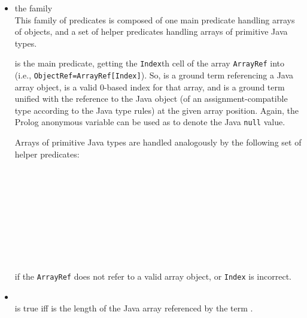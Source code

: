 \begin{itemize}
\item the  family\\
    This family of predicates is composed of one main predicate handling arrays of objects, and a set of helper predicates handling arrays of primitive Java types.

     is the main predicate, getting the \texttt{Index}th cell of the array \texttt{ArrayRef} into  (i.e., \texttt{ObjectRef=ArrayRef[Index]}).
    So,  is a ground term referencing a Java array object,  is a valid 0-based index for that array, and  is a ground term unified with the reference to the Java object (of an assignment-compatible type according to the Java type rules) at the given array position.
    Again, the Prolog anonymous variable can be used as  to denote the Java \texttt{null} value.

    Arrays of primitive Java types are handled analogously by the following set of helper predicates:

    \mbox{~~~~}\\
    \mbox{~~~~}\\
    \mbox{~~~~}\\
    \mbox{~~~~}\\
    \mbox{~~~~}\\
    \mbox{~~~~}\\
    \mbox{~~~~}\\
    \mbox{~~~~}


     if the \texttt{ArrayRef} does not refer to a valid array object, or \texttt{Index} is incorrect.

\item {}\\
    \noindent{} is true iff  is the length of the Java array referenced by
    the term .

\end{itemize}


